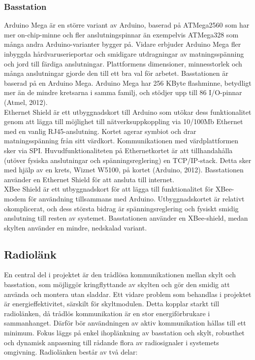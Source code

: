 \documentclass[a4paper,11pt]{article}
\begin{document}
\subsubsection{Basstation}
Arduino Mega är en större variant av Arduino, baserad på ATMega2560 som har mer on-chip-minne och fler anslutningspinnar än exempelvis ATMega328 som många andra Arduino-varianter bygger på. Vidare erbjuder Arduino Mega fler inbyggda hårdvaruserieportar och smidigare utdragningar av matningsspänning och jord till färdiga anslutningar. Plattformens dimensioner, minnesstorlek och många anslutningar gjorde den till ett bra val för arbetet. Basstationen är baserad på en Arduino Mega. Arduino Mega har 256 KByte flashminne, betydligt mer än de mindre kretsarna i samma familj, och stödjer upp till 86 I/O-pinnar (Atmel, 2012). \\

Ethernet Shield är ett utbyggnadskort till Arduino som utökar dess funktionalitet genom att lägga till möjlighet till nätverksuppkoppling via 10/100Mb Ethernet med en vanlig RJ45-anslutning. Kortet agerar symbiot och drar matningsspänning från sitt värdkort. Kommunikationen med värdplattformen sker via SPI. Huvudfunktionaliteten på Ethernetkortet är att tillhandahålla (utöver fysiska anslutningar och spänningsreglering) en TCP/IP-stack. Detta sker med hjälp av en krets, Wiznet W5100, på kortet (Arduino, 2012). Basstationen använder en Ethernet Shield för att ansluta till internet. \\

XBee Shield är ett utbyggnadskort för att lägga till funktionalitet för XBee-modem för användning tillsammans med Arduino. Utbyggnadskortet är relativt okomplicerat, och dess största bidrag är spänningsreglering och fysiskt smidig anslutning till resten av systemet. Basstationen använder en XBee-shield, medan skylten använder en mindre, nedskalad variant.

\subsection{Radiolänk}
En central del i projektet är den trådlösa kommunikationen mellan skylt och basstation, som möjliggör kringflyttande av skylten och gör den smidig att använda och montera utan sladdar. Ett vidare problem som behandlas i projektet är energieffektivitet, särskilt för skyltmodulen. Detta kopplar starkt till radiolänken, då trådlös kommunikation är en stor energiförbrukare i sammanhanget. Därför bör användningen av aktiv kommunikation hållas till ett minimum. Fokus läggs på enkel ihoplänkning av basstation och skylt, robusthet och dynamisk anpassning till rådande flora av radiosignaler i systemets omgivning. Radiolänken består av två delar:
	
\end{document}
